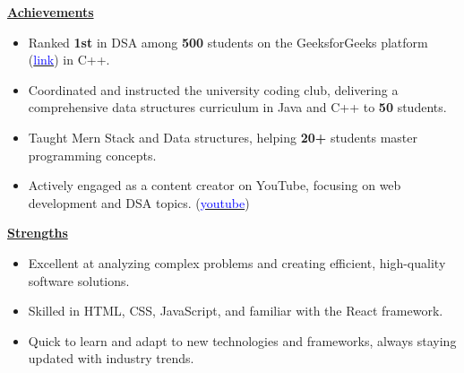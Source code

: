 \documentclass{article}
\begin{document}
\noindent \textbf{\underline{Achievements}} \\
\begin{itemize}[noitemsep,nolistsep,leftmargin=*]
\item Ranked \textbf{1st} in DSA among \textbf{500} students on the GeeksforGeeks platform (\href{https://www.geeksforgeeks.org/user/rahulyada9obo/}{\textcolor{blue}{link}}) in C++.
\item Coordinated and instructed the university coding club, delivering a comprehensive data structures curriculum in Java and C++ to \textbf{50} students.
\item Taught Mern Stack and Data structures, helping \textbf{20+} students master programming concepts.
\item Actively engaged as a content creator on YouTube, focusing on web development and DSA topics. (\href{https://www.youtube.com/@UNQCODER/}{\textcolor{blue}{youtube}})
\end{itemize}

\noindent \textbf{\underline{Strengths}} \\
\begin{itemize}[noitemsep,nolistsep,leftmargin=*]
\item Excellent at analyzing complex problems and creating efficient, high-quality software solutions.
\item Skilled in HTML, CSS, JavaScript, and familiar with the React framework.
\item Quick to learn and adapt to new technologies and frameworks, always staying updated with industry trends.
\end{itemize}
\end{document}
